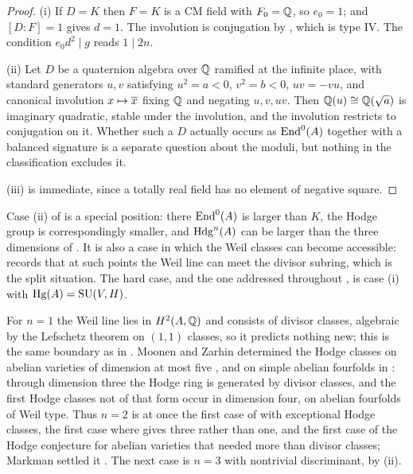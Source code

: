 \begin{proof}
(i) If $D=K$ then $F=K$ is a CM field with $F_{0}=\mathbb{Q}$, so $e_{0}=1$; and
$[D:F]=1$ gives $d=1$. The involution is conjugation by
, which is type IV. The condition $e_{0}d^{2}\mid g$ reads
$1\mid 2n$.

(ii) Let $D$ be a quaternion algebra over $\mathbb{Q}$ ramified at the infinite place,
with standard generators $u,v$ satisfying $u^{2}=a<0$, $v^{2}=b<0$, $uv=-vu$,
and canonical involution $x\mapsto\overline{x}$ fixing $\mathbb{Q}$ and negating
$u,v,uv$. Then $\mathbb{Q}(u)\cong\mathbb{Q}(\sqrt{a})$ is imaginary quadratic, stable under
the involution, and the involution restricts to conjugation on it. Whether
such a $D$ actually occurs as $\operatorname{End}^{0}(A)$ together with a balanced signature
is a separate question about the moduli, but nothing in the classification
excludes it.

(iii) is immediate, since a totally real field has no element of negative
square.
\end{proof}

\begin{remark}\label{rem:genericcase}
Case (ii) of  is a special position: there
$\operatorname{End}^{0}(A)$ is larger than $K$, the Hodge group is correspondingly smaller,
and $\mathrm{Hdg}^{n}(A)$ can be larger than the three dimensions of
. It is also a case in which the Weil classes can become
accessible:  records that at such points the Weil line can
meet the divisor subring, which is the split situation. The hard case, and the
one addressed throughout , is
case (i) with $\operatorname{Hg}(A)=\operatorname{SU}(V,H)$.
\end{remark}

\begin{remark}\label{rem:dimfour}
For $n=1$ the Weil line lies in $H^{2}(A,\mathbb{Q})$ and consists of divisor
classes, algebraic by the Lefschetz theorem on $(1,1)$ classes, so it predicts
nothing new; this is the same boundary as in . Moonen and
Zarhin determined the Hodge classes on abelian varieties of dimension at most
five \cite{MZ99}, and on simple abelian fourfolds in \cite{MZ95}: through
dimension three the Hodge ring is generated by divisor classes, and the first
Hodge classes not of that form occur in dimension four, on abelian fourfolds of
Weil type. Thus $n=2$ is at once the first case of  with
exceptional Hodge classes, the first case where  gives
three rather than one, and the first case of the Hodge conjecture for
abelian varieties that needed more than divisor classes; Markman settled it
\cite[Corollary 1.6.1]{Mar25a}. The next case is $n=3$ with nontrivial
discriminant, by (ii).
\end{remark}
